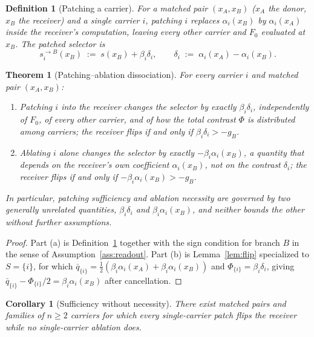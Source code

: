 \documentclass[11pt,a4paper]{article}
\newtheorem{theorem}{Theorem}
\newtheorem{definition}{Definition}
\newtheorem{corollary}{Corollary}
\begin{document}
\begin{definition}[Patching a carrier]
\label{def:patch}
For a matched pair $(x_A,x_B)$ ($x_A$ the \emph{donor}, $x_B$ the
\emph{receiver}) and a single carrier $i$, \emph{patching} $i$ replaces
$\alpha_i(x_B)$ by $\alpha_i(x_A)$ inside the receiver's computation, leaving
every other carrier and $F_0$ evaluated at $x_B$. The patched selector is
\[
s_i^{\to B}(x_B) \;:=\; s(x_B) + \beta_i\delta_i,
\qquad
\delta_i \;:=\; \alpha_i(x_A)-\alpha_i(x_B).
\]
\end{definition}

\begin{theorem}[Patching--ablation dissociation]
\label{thm:dissociation}
For every carrier $i$ and matched pair $(x_A,x_B)$:
\begin{enumerate}
\item[(a)] Patching $i$ into the receiver changes the selector by exactly
$\beta_i\delta_i$, \emph{independently of $F_0$, of every other carrier,
and of how the total contrast $\Phi$ is distributed among carriers};
the receiver flips if and only if $\beta_i\delta_i > -g_B$.
\item[(b)] Ablating $i$ alone changes the selector by exactly $-\beta_i\alpha_i(x_B)$,
a quantity that depends on the receiver's own coefficient $\alpha_i(x_B)$, not
on the contrast $\delta_i$; the receiver flips if and only if
$-\beta_i\alpha_i(x_B) > -g_B$.
\end{enumerate}
In particular, patching sufficiency and ablation necessity are governed by two
generally unrelated quantities, $\beta_i\delta_i$ and $\beta_i\alpha_i(x_B)$,
and neither bounds the other without further assumptions.
\end{theorem}

\begin{proof}
Part (a) is Definition~\ref{def:patch} together with the sign condition for
branch $B$ in the sense of Assumption~\ref{ass:readout}. Part (b) is
Lemma~\ref{lem:flip} specialized to $S=\{i\}$, for which $\bar q_{\{i\}}
=\tfrac12(\beta_i\alpha_i(x_A)+\beta_i\alpha_i(x_B))$ and $\Phi_{\{i\}}
=\beta_i\delta_i$, giving $\bar q_{\{i\}}-\Phi_{\{i\}}/2=\beta_i\alpha_i(x_B)$
after cancellation.
\end{proof}

\begin{corollary}[Sufficiency without necessity]
\label{cor:sufficiency}
There exist matched pairs and families of $n\ge2$ carriers for which every
single-carrier patch flips the receiver while no single-carrier ablation
does.
\end{corollary}
\end{document}
